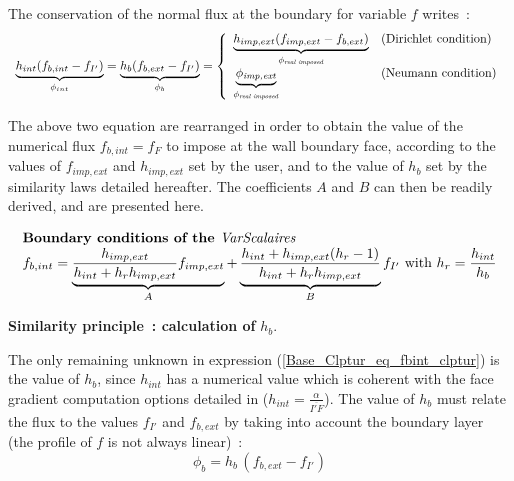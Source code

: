 The conservation of the normal flux at the boundary for variable $f$ writes~:
\begin{equation}\label{Base_Clptur_eq_flux_clptur}
\begin{array}{l}
    \underbrace{h_{int}(f_{b,int}-f_{I'})}_{\phi_{int}}
  = \underbrace{h_{b}(f_{b,ext}-f_{I'})}_{\phi_{b}}
  = \left\{\begin{array}{ll}
    \underbrace{h_{imp,ext}(f_{imp,ext}-f_{b,ext})}_{\phi_{\text{\it real
imposed}}} &\text{(Dirichlet condition)}\\
    \underbrace{\phi_{\text{\it imp,ext}}}_{\phi_{\text{\it real imposed}}}
            &\text{(Neumann condition)}
           \end{array}\right.
\end{array}
\end{equation}

The above two equation are rearranged in order to obtain the value of the 
numerical flux $f_{b,int}=f_{F}$ to impose at the wall boundary face, 
according to the values of $f_{imp,ext}$ and $h_{imp,ext}$ set by the user, 
and to the value of  $h_{b}$ set by the similarity laws detailed hereafter.
The coefficients $A$ and $B$  can then be readily derived, and are presented here.  

\begin{equation}\label{Base_Clptur_eq_fbint_clptur}
\begin{array}{l}
\text{\bf Boundary conditions of the {\it VarScalaires} }\\
f_{b,int} =
\underbrace{\displaystyle\frac{h_{imp,ext}}{h_{int}+h_r h_{imp,ext} } f_{imp,ext}}_{A} +
\underbrace{\displaystyle\frac{h_{int}+h_{imp,ext}(h_r-1)}{h_{int}+h_r h_{imp,ext} }}_{B} f_{I'}
\text{  with } h_r=\displaystyle\frac{h_{int}}{h_{b}}
\end{array}
\end{equation}


\newpage
{\bf Similarity principle~: calculation of } $h_b$.

The only remaining unknown in expression (\ref{Base_Clptur_eq_fbint_clptur})
is the value of $h_{b}$, since  $h_{int}$ has a numerical value which
is coherent with the face gradient computation options detailed in  
  ($h_{int}=\displaystyle\frac{\alpha}{\overline{I'F}}$).
The value of  $h_{b}$ must relate the flux to the values  
$f_{I'}$ and $f_{b,ext}$ by taking into account the boundary layer 
(the profile of $f$ is not always linear)~:
\begin{equation}
\phi_b=h_b\,(f_{b,ext}-f_{I'})
\end{equation}


